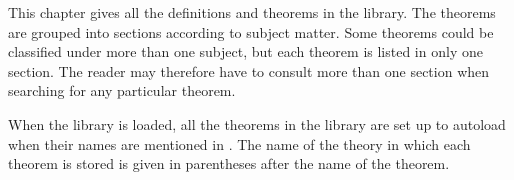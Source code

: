 This chapter gives all the definitions and theorems in the
 library. The theorems are grouped into sections
according to subject matter. Some theorems could be classified under more than
one subject, but each theorem is listed in only one section. The reader may
therefore have to consult more than one section when searching for any
particular theorem.


 When the library is loaded, all the theorems in the library are set up to
autoload when their names are mentioned in \ML.  The name of the theory in
which each theorem is stored is given in parentheses after the name of the
theorem.


